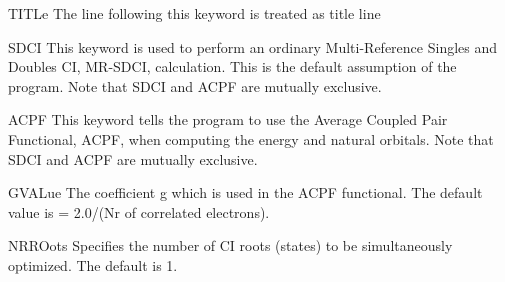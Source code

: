  
\begin{keywordlist}
\item[TITLe]
The line following this keyword is treated as title line
\item[SDCI]
This keyword is used to perform an ordinary Multi-{}Reference
Singles and Doubles CI, MR-{}SDCI, calculation. This is the default
assumption of the program.
Note that SDCI and ACPF are mutually exclusive.
\item[ACPF]
This keyword tells the program to use the Average Coupled Pair
Functional, ACPF, when computing the energy and natural orbitals.
Note that SDCI and ACPF are mutually exclusive.
\item[GVALue]
The coefficient g which is used in the ACPF functional. The default
value is = 2.0/(Nr of correlated electrons).
\item[NRROots]
Specifies the number of CI roots (states) to be simultaneously
optimized. The default is 1.



\end{keywordlist}
